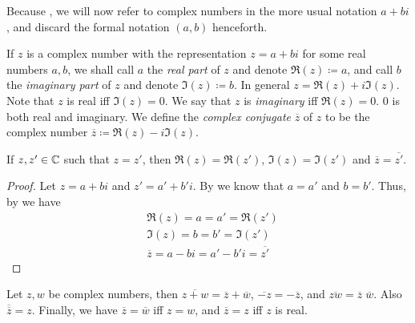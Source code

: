 \begin{note}
  Because , we will now refer to complex numbers in the more usual notation \(a + bi\), and discard the formal notation \((a, b)\) henceforth.
\end{note}

\begin{defn}\label{ii:4.6.8}
  If \(z\) is a complex number with the representation \(z = a + bi\) for some real numbers \(a, b\), we shall call \(a\) the \emph{real part} of \(z\) and denote \(\Re(z) \coloneqq a\), and call \(b\) the \emph{imaginary part} of \(z\) and denote \(\Im(z) \coloneqq b\).
  In general \(z = \Re(z) + i \Im(z)\).
  Note that \(z\) is real iff \(\Im(z) = 0\).
  We say that \(z\) is \emph{imaginary} iff \(\Re(z) = 0\).
  \(0\) is both real and imaginary.
  We define the \emph{complex conjugate} \(\overline{z}\) of \(z\) to be the complex number \(\overline{z} \coloneqq \Re(z) - i \Im(z)\).
\end{defn}

\begin{ac}\label{ii:ac:4.6.4}
  If \(z, z' \in \mathbb{C}\) such that \(z = z'\), then \(\Re(z) = \Re(z')\), \(\Im(z) = \Im(z')\) and \(\overline{z} = \overline{z'}\).
\end{ac}

\begin{proof}
  Let \(z = a + bi\) and \(z' = a' + b' i\).
  By  we know that \(a = a'\) and \(b = b'\).
  Thus, by  we have
  \begin{align*}
     & \Re(z) = a = a' = \Re(z')                         \\
     & \Im(z) = b = b' = \Im(z')                         \\
     & \overline{z} = a - bi = a' - b' i = \overline{z'}
  \end{align*}
\end{proof}

\begin{lem}\label{ii:4.6.9}
  Let \(z, w\) be complex numbers, then \(\overline{z + w} = \overline{z} + \overline{w}\), \(\overline{-z} = -\overline{z}\), and \(\overline{zw} = \overline{z} \; \overline{w}\).
  Also \(\overline{\overline{z}} = z\).
  Finally, we have \(\overline{z} = \overline{w}\) iff \(z = w\), and \(\overline{z} = z\) iff \(z\) is real.
\end{lem}

